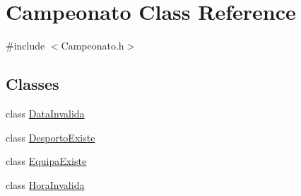 \hypertarget{class_campeonato}{}\section{Campeonato Class Reference}
\label{class_campeonato}


{\ttfamily \#include $<$Campeonato.\+h$>$}

\subsection*{Classes}
\begin{DoxyCompactItemize}
\item 
class \hyperlink{class_campeonato_1_1_data_invalida}{Data\+Invalida}
\item 
class \hyperlink{class_campeonato_1_1_desporto_existe}{Desporto\+Existe}
\item 
class \hyperlink{class_campeonato_1_1_equipa_existe}{Equipa\+Existe}
\item 
class \hyperlink{class_campeonato_1_1_hora_invalida}{Hora\+Invalida}
\end{DoxyCompactItemize}
